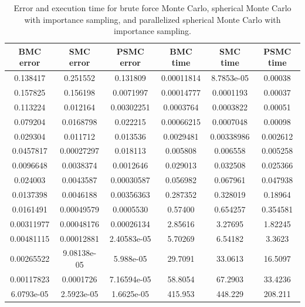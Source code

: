\documentclass{article}
\begin{document}
    \begin{table}[ht] \label{tab:error-MonteCarlo}
    \centering
      \caption{Error and execution time for brute force Monte Carlo, spherical Monte Carlo with importance sampling, and parallelized spherical Monte Carlo with importance sampling.}
      \vspace{2mm}
      \begin{tabular}{|c|c|c|c|c|c|}
        \hline
        BMC error & SMC error & PSMC error & BMC time & SMC time & PSMC time  \\
        \hline \hline
        0.138417 & 0.251552 & 0.131809 & 0.00011814 & 8.7853e-05 & 0.00038 \\
        0.157825 & 0.156198 & 0.0071997 & 0.00014777 & 0.0001193 & 0.00037 \\
        0.113224 & 0.012164 & 0.00302251 & 0.0003764 & 0.0003822 & 0.00051 \\
        0.079204 & 0.0168798 & 0.022215 & 0.00066215 & 0.0007048 & 0.00098 \\
        0.029304 & 0.011712 & 0.013536 & 0.0029481 & 0.00338986 & 0.002612 \\
        0.0457817 & 0.00027297 & 0.018113 & 0.005808 & 0.006558 & 0.005258 \\
        0.0096648 & 0.0038374 & 0.0012646 & 0.029013 & 0.032508 & 0.025366 \\
        0.024003 & 0.0043587 & 0.00030587 & 0.056982 & 0.067961 & 0.047938 \\
        0.0137398 & 0.0046188 & 0.00356363 & 0.287352 & 0.328019 & 0.18964 \\
        0.0161491 & 0.00049579 & 0.0005530 & 0.57400 & 0.654257 & 0.354581 \\
        0.00311977 & 0.00048176 & 0.00026134 & 2.85616 & 3.27695 & 1.82245 \\
        0.00481115 & 0.00012881 & 2.40583e-05 & 5.70269 & 6.54182 & 3.3623 \\
        0.00265522 & 9.08138e-05 & 5.988e-05 & 29.7091 & 33.0613 & 16.5097 \\
        0.00117823 & 0.0001726 & 7.16594e-05 & 58.8054 & 67.2903 & 33.4236 \\
        6.0793e-05 & 2.5923e-05 & 1.6625e-05 & 415.953 & 448.229 & 208.211 \\
        \hline
      \end{tabular} \\
      \hspace{0pt}\\
  \end{table}
\end{document}
